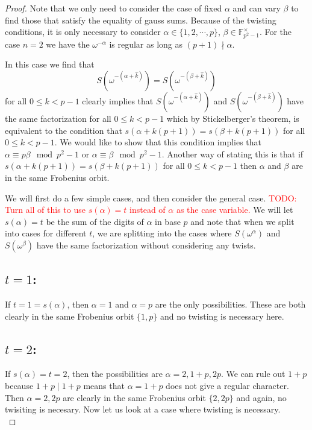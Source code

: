 \documentclass[12pt]{article}
\theoremstyle{customtheorem}%
\theoremstyle{remark}
\theoremstyle{definition}
\numberwithin{equation}{section}
\numberwithin{theorem}{section}
\newcommand{\F}{\mathbb{F}}
\begin{document}
\begin{proof}
Note that we only need to consider the case of fixed $\alpha$ and can vary $\beta$ to find those that satisfy the equality of gauss sums. 
Because of the twisting conditions, it is only necessary to consider $\alpha \in \{1, 2, \cdots , p\}$, $\beta \in \F_{p^2-1}^\times$. 
For the case $n=2$ we have the $\omega^{-\alpha}$ is regular as long as $(p+1)\nmid \alpha$.

In this case we find that \[S(\omega^{-(\alpha + \hat{k})}) = S(\omega^{-(\beta + \hat{k})})\] for all $0 \leq k < p-1$ clearly implies that $S(\omega^{-(\alpha+\hat{k})})$ and $S(\omega^{-(\beta + \hat{k})})$ have the same factorization for all $0 \leq k < p-1$ which by Stickelberger's theorem, is equivalent to the condition that $s(\alpha + k(p+1)) = s(\beta + k(p+1))$ for all $0 \leq k < p-1$. 
We would like to show that this condition implies that $\alpha \equiv p \beta \mod p^2 -1$ or $\alpha \equiv \beta \mod p^2 - 1$. 
Another way of stating this is that if $s(\alpha + k(p+1)) = s(\beta+k(p+1))$ for all $0 \leq k < p-1$ then $\alpha$ and $\beta$ are in the same Frobenius orbit.

We will first do a few simple cases, and then consider the general case.
\textcolor{red}{TODO: Turn all of this to use $s(\alpha) = t$ instead of $\alpha$ as the case variable.}
We will let $s(\alpha) = t$ be the sum of the digits of $\alpha$ in base $p$ and note that when we split into cases for different $t$, we are splitting into the cases where $S(\omega^\alpha)$ and  $S(\omega^\beta)$ have the same factorization without considering any twists.
\\

\subsection{$t = 1$:} If $t = 1 = s(\alpha)$, then $\alpha = 1$ and $\alpha = p$ are the only possibilities. 
These are both clearly in the same Frobenius orbit $\{1,p\}$ and no twisting is necessary here.
\\

\subsection{$t = 2$:} If $s(\alpha) = t = 2$, then the possibilities are $\alpha = 2, 1+p, 2p$. 
We can rule out $1+p$ because $1+p \mid 1+p$ means that $\alpha = 1+p$ does not give a regular character. 
Then $\alpha = 2, 2p$ are clearly in the same Frobenius orbit $\{2,2p\}$ and again, no twisiting is necesary. 
Now let us look at a case where twisting is necessary.
\\


\end{proof}
\end{document}
